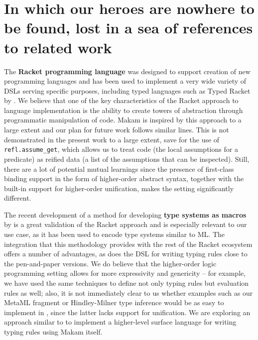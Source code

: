 \section{In which our heroes are nowhere to be found, lost in a sea of
references to related
work}\label{in-which-our-heroes-are-nowhere-to-be-found-lost-in-a-sea-of-references-to-related-work}

\identNormal

The \textbf{Racket programming language} was designed to support
creation of new programming languages \citep{racket-manifesto} and has
been used to implement a very wide variety of DSLs serving specific
purposes, including typed languages such as Typed Racket by
\citet{typed-racket-main-reference}. We believe that one of the key
characteristics of the Racket approach to language implementation is the
ability to create towers of abstraction through programmatic
manipulation of code. Makam is inspired by this approach to a large
extent and our plan for future work follows similar lines. This is not
demonstrated in the present work to a large extent, save for the use of
\texttt{refl.assume\_get}, which allows us to treat code (the local
assumptions for a predicate) as reified data (a list of the assumptions
that can be inspected). Still, there are a lot of potential mutual
learnings since the presence of first-class binding support in the form
of higher-order abstract syntax, together with the built-in support for
higher-order unification, makes the \lamprolog
setting significantly different.

The recent development of a method for developing \textbf{type systems
as macros} by \citet{racket-type-systems-as-macros} is a great
validation of the Racket approach and is especially relevant to our use
case, as it has been used to encode type systems similar to ML. The
integration that this methodology provides with the rest of the Racket
ecosystem offers a number of advantages, as does the
 DSL for writing typing rules close to the
pen-and-paper versions. We do believe that the higher-order logic
programming setting allows for more expressivity and genericity -- for
example, we have used the same techniques to define not only typing
rules but evaluation rules as well; also, it is not immediately clear to
us whether examples such as our MetaML fragment or Hindley-Milner type
inference would be as easy to implement in , since
the latter lacks support for unification. We are exploring an approach
similar to  to implement a higher-level surface
language for writing typing rules using Makam itself.

